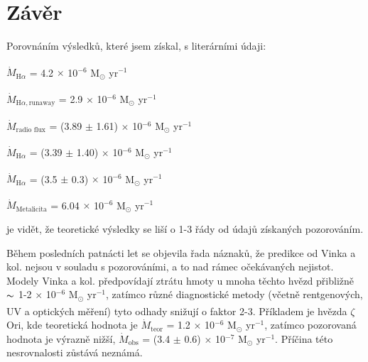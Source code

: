 \documentclass[a4paper,11pt]{article}
\begin{document}
\begin{minipage}[t]{0.5\textwidth}
        \section{Závěr}
            Porovnáním výsledků, které jsem získal, s literárními údaji: 
            \begin{center}
                $\dot{M}_{\text{H}\alpha}$ = 4.2\textsuperscript{\cite{2004A&A...413..693M}} $\times$ 10$^{-6}$ M$_{\odot}$ yr$^{-1}$
                \vspace{5pt}
                \par $\dot{M}_{\text{H}\alpha,\text{runaway}}$ = 2.9\textsuperscript{\cite{2004A&A...413..693M}} $\times$ 10$^{-6}$ M$_{\odot}$ yr$^{-1}$
                \vspace{5pt}
                \par $\dot{M}_{\text{radio flux}}$ = (3.89 $\pm$ 1.61)\textsuperscript{\cite{1993ApJ...412..771L}} $\times$ 10$^{-6}$ M$_{\odot}$ yr$^{-1}$
                \vspace{5pt}
                \par $\dot{M}_{\text{H}\alpha}$ = (3.39 $\pm$ 1.40)\textsuperscript{\cite{1993ApJ...412..771L}} $\times$ 10$^{-6}$ M$_{\odot}$ yr$^{-1}$
                \vspace{5pt}
                \par $\dot{M}_{\text{H}\alpha}$ = (3.5 $\pm$ 0.3)\textsuperscript{\cite{1981ApJ...248.1021O}} $\times$ 10$^{-6}$ M$_{\odot}$ yr$^{-1}$
                \vspace{5pt}
                \par $\dot{M}_{\text{Metalicita}}$ = 6.04\textsuperscript{\cite{2007A&A...473..603M}} $\times$ 10$^{-6}$ M$_{\odot}$ yr$^{-1}$
            \end{center}
            je vidět, že teoretické výsledky se liší o 1-3 řády od údajů získaných pozorováním.
            \par Během posledních patnácti let se objevila řada náznaků, že predikce od Vinka a kol. nejsou v souladu s pozorováními, a to nad rámec očekávaných nejistot. Modely Vinka a kol. předpovídají ztrátu hmoty u mnoha těchto hvězd přibližně $\thicksim$ 1-2 $\times$ 10$^{-6}$ M$_{\odot}$ yr$^{-1}$, zatímco různé diagnostické metody (včetně rentgenových, UV a optických měření) tyto odhady snižují o faktor 2-3\textsuperscript{\cite{2006A&A...454..625P}}. Příkladem je hvězda $\zeta$ Ori, kde teoretická hodnota je $\dot{M}_{\text{teor}}$ = 1.2 $\times$ 10$^{-6}$ M$_{\odot}$ yr$^{-1}$, zatímco pozorovaná hodnota je výrazně nižší, $\dot{M}_{\text{obs}}$ = (3.4 $\pm$ 0.6) $\times$ 10$^{-7}$ M$_{\odot}$ yr$^{-1}$. Příčina této nesrovnalosti zůstává neznámá.
    \end{minipage}
        
\end{document}
